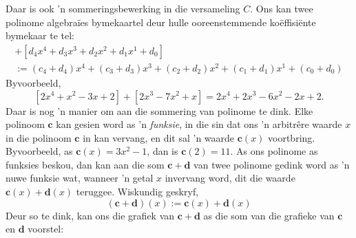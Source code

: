 \documentclass[a4paper,11pt]{book}
\theoremstyle{definition}
\newcommand{\be}{\begin{equation}}
\newcommand{\ee}{\end{equation}}
\newcommand{\ve}[1]{\mathbf{#1}}
\begin{document}
Daar is ook 'n sommeringsbewerking in die versameling $C$. Ons kan twee
polinome algebra{\"i}es bymekaartel deur hulle ooreenstemmende
ko{\"e}ffisi{\"e}nte
bymekaar te tel:
\begin{multline}
	[c_4 x^4 + c_3 x^3 + c_2 x^2 + c_1 x^1 + c_0] + [d_4 x^4 + d_3 x^3 +
	d_2 x^2 + d_1 x^1 + d_0] \\
	:= (c_4 + d_4) x^4 + (c_3 + d_3) x^3 + (c_2 + d_2) x^2 + (c_1 + d_1)
	x^1 + (c_0 + d_0)
\end{multline}
Byvoorbeeld,
\[
	[2x^4  + x^2 - 3x + 2] + [2x^3 - 7x^2 + x]
= 2x^4 + 2x^3 - 6x^2 -2x + 2.
\]
Daar is nog 'n manier om aan die sommering van polinome te dink. Elke
polinoom $\ve{c}$ kan gesien word as 'n \emph{funksie}, in die sin dat ons
'n arbitr{\^e}re waarde $x$ in die polinoom $\ve{c}$ in kan vervang, en dit
sal 'n waarde $\ve{c}(x)$ voortbring. Byvoorbeeld, as $\ve{c}(x) = 3x^2 -
1$, dan is $\ve{c}(2) = 11$. As ons polinome as funksies beskou, dan kan
aan die som $\ve{c} + \ve{d}$ van twee polinome gedink word as 'n nuwe
funksie wat, wanneer 'n getal $x$ invervang word, dit die waarde
$\ve{c}(x) + \ve{d}(x)$ teruggee. Wiskundig geskryf,
\be \label{add_in_C}
(\ve{c} + \ve{d})(x) := \ve{c}(x) + \ve{d}(x)
\ee
Deur so te dink, kan ons die grafiek van $\ve{c} + \ve{d}$ as die som van
die grafieke van $\ve{c}$ en $\ve{d}$ voorstel:
\end{document}
